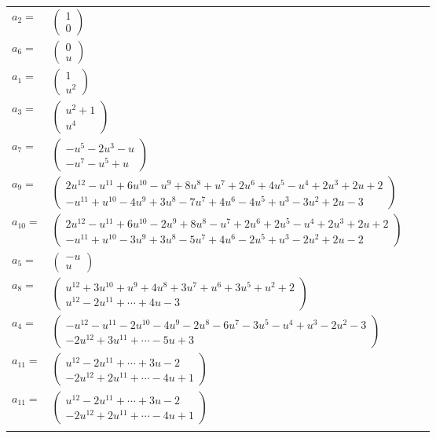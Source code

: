 \documentclass[1p]{elsarticle_modified}
\theoremstyle{definition}
\begin{document}
\begin{tabular}{m{7pt} m{180pt} m{7pt} m{180pt} }
\flushright $a_{2}=$&$\begin{pmatrix}1\\0\end{pmatrix}$ \\
\flushright $a_{6}=$&$\begin{pmatrix}0\\u\end{pmatrix}$ \\
\flushright $a_{1}=$&$\begin{pmatrix}1\\u^2\end{pmatrix}$ \\
\flushright $a_{3}=$&$\begin{pmatrix}u^2+1\\u^4\end{pmatrix}$ \\
\flushright $a_{7}=$&$\begin{pmatrix}- u^5-2 u^3- u\\- u^7- u^5+u\end{pmatrix}$ \\
\flushright $a_{9}=$&$\begin{pmatrix}2 u^{12}- u^{11}+6 u^{10}- u^9+8 u^8+u^7+2 u^6+4 u^5- u^4+2 u^3+2 u+2\\- u^{11}+u^{10}-4 u^9+3 u^8-7 u^7+4 u^6-4 u^5+u^3-3 u^2+2 u-3\end{pmatrix}$ \\
\flushright $a_{10}=$&$\begin{pmatrix}2 u^{12}- u^{11}+6 u^{10}-2 u^9+8 u^8- u^7+2 u^6+2 u^5- u^4+2 u^3+2 u+2\\- u^{11}+u^{10}-3 u^9+3 u^8-5 u^7+4 u^6-2 u^5+u^3-2 u^2+2 u-2\end{pmatrix}$ \\
\flushright $a_{5}=$&$\begin{pmatrix}- u\\u\end{pmatrix}$ \\
\flushright $a_{8}=$&$\begin{pmatrix}u^{12}+3 u^{10}+u^9+4 u^8+3 u^7+u^6+3 u^5+u^2+2\\u^{12}-2 u^{11}+\cdots+4 u-3\end{pmatrix}$ \\
\flushright $a_{4}=$&$\begin{pmatrix}- u^{12}- u^{11}-2 u^{10}-4 u^9-2 u^8-6 u^7-3 u^5- u^4+u^3-2 u^2-3\\-2 u^{12}+3 u^{11}+\cdots-5 u+3\end{pmatrix}$ \\
\flushright $a_{11}=$&$\begin{pmatrix}u^{12}-2 u^{11}+\cdots+3 u-2\\-2 u^{12}+2 u^{11}+\cdots-4 u+1\end{pmatrix}$\\ \flushright $a_{11}=$&$\begin{pmatrix}u^{12}-2 u^{11}+\cdots+3 u-2\\-2 u^{12}+2 u^{11}+\cdots-4 u+1\end{pmatrix}$\\&\end{tabular}
\end{document}
